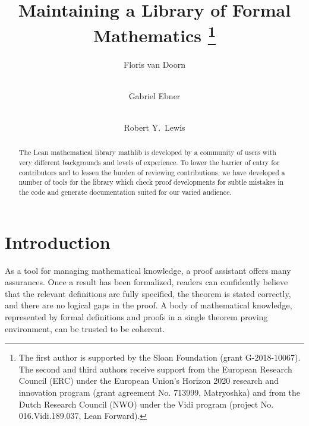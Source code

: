 \documentclass[runningheads]{llncs}
\begin{document}
%
\title{Maintaining a Library of Formal Mathematics
\thanks{The first author is supported by the Sloan Foundation (grant G-2018-10067).
The second and third authors receive support
from the European Research Council (ERC) under
the European Union's Horizon 2020 research and innovation
program (grant agreement No. 713999, Matryoshka)
and from the Dutch Research Council (NWO) under the
Vidi program (project No. 016.Vidi.189.037, Lean Forward).}
}
%
%
\author{Floris van Doorn \and \\
Gabriel Ebner \and \\
Robert Y.\ Lewis}
%
%
%
\maketitle              %
%
\begin{abstract}
The Lean mathematical library \textsf{mathlib}
is developed by a community of users
with very different backgrounds and levels of experience.
To lower the barrier of entry for contributors
and to lessen the burden of reviewing contributions,
we have developed a number of tools for the library
which check proof developments for subtle mistakes in the code
and generate documentation suited for our varied audience.

\end{abstract}

\section{Introduction}
\label{section:intro}

As a tool for managing mathematical knowledge,
a proof assistant offers many assurances.
Once a result has been formalized,
readers can confidently believe that
the relevant definitions are fully specified,
the theorem is stated correctly,
and there are no logical gaps in the proof.
A body of mathematical knowledge,
represented by formal definitions and proofs
in a single theorem proving environment,
can be trusted to be coherent.
\end{document}
